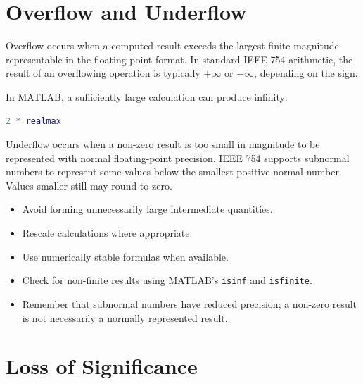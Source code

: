 \section{Overflow and Underflow}

\begin{definition}[Overflow]
  Overflow occurs when a computed result exceeds the largest finite magnitude representable in the floating-point format. In standard IEEE 754 arithmetic, the result of an overflowing operation is typically \(+\infty\) or \(-\infty\), depending on the sign.
\end{definition}

\begin{example}
  In MATLAB, a sufficiently large calculation can produce infinity:
  \begin{lstlisting}[language=Matlab]
  2 * realmax
  \end{lstlisting}
\end{example}

\begin{definition}[Underflow]
  Underflow occurs when a non-zero result is too small in magnitude to be represented with normal floating-point precision. IEEE 754 supports subnormal numbers to represent some values below the smallest positive normal number. Values smaller still may round to zero.
\end{definition}

\begin{remark}
  \begin{itemize} \emph{}
    \item Avoid forming unnecessarily large intermediate quantities.
    \item Rescale calculations where appropriate.
    \item Use numerically stable formulas when available.
    \item Check for non-finite results using MATLAB's \texttt{isinf} and \texttt{isfinite}.
    \item Remember that subnormal numbers have reduced precision; a non-zero result is not necessarily a normally represented result.
  \end{itemize}
\end{remark}

\section{Loss of Significance}

